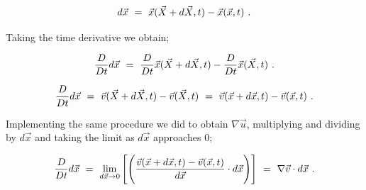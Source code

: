\documentclass{article}
\begin{document}
\begin{equation} \label{eb-eq-1-105}
d \vec{x} \hspace{0.125cm} = \hspace{0.125cm} \vec{x}(\vec{X} + d \vec{X}, t) - \vec{x}(\vec{x}, t) \hspace{0.125cm}  . 
\end{equation} 

Taking the time derivative we obtain;

\begin{equation} \label{eb-eq-1-106}
\frac{D}{D t} d \vec{x} \hspace{0.125cm} = \hspace{0.125cm} \frac{D}{D t} \vec{x}(\vec{X} + d \vec{X}, t) - \frac{D}{D t} \vec{x}(\vec{X}, t) \hspace{0.125cm}  . 
\end{equation} 

\begin{equation} \label{eb-eq-1-107}
\frac{D}{D t} d \vec{x} \hspace{0.125cm} = \hspace{0.125cm} \vec{v}(\vec{X} + d \vec{X}, t) - \vec{v}(\vec{X}, t) \hspace{0.125cm} = \hspace{0.125cm} \vec{v}(\vec{x} + d \vec{x}, t) - \vec{v}(\vec{x}, t) \hspace{0.125cm} . 
\end{equation} 

Implementing the same procedure we did to obtain \begin{math} \nabla{\vec{u}} \end{math}, multiplying and dividing by \begin{math} d \vec{x} \end{math} and taking the limit as \begin{math} d \vec{x} \end{math} approaches \begin{math} 0 \end{math};

\begin{equation} \label{eb-eq-1-108}
\frac{D}{D t} d \vec{x} \hspace{0.125cm} = \hspace{0.125cm} \lim_{d \vec{x} \rightarrow 0} \Bigg[ \Bigg( \frac{\vec{v}(\vec{x} + d \vec{x}, t) - \vec{v}(\vec{x}, t)}{d \vec{x}} \cdot d \vec{x} \Bigg) \Bigg] \hspace{0.125cm} = \hspace{0.125cm} \nabla{\vec{v}} \cdot d \vec{x} \hspace{0.125cm} . 
\end{equation} 
\end{document}
